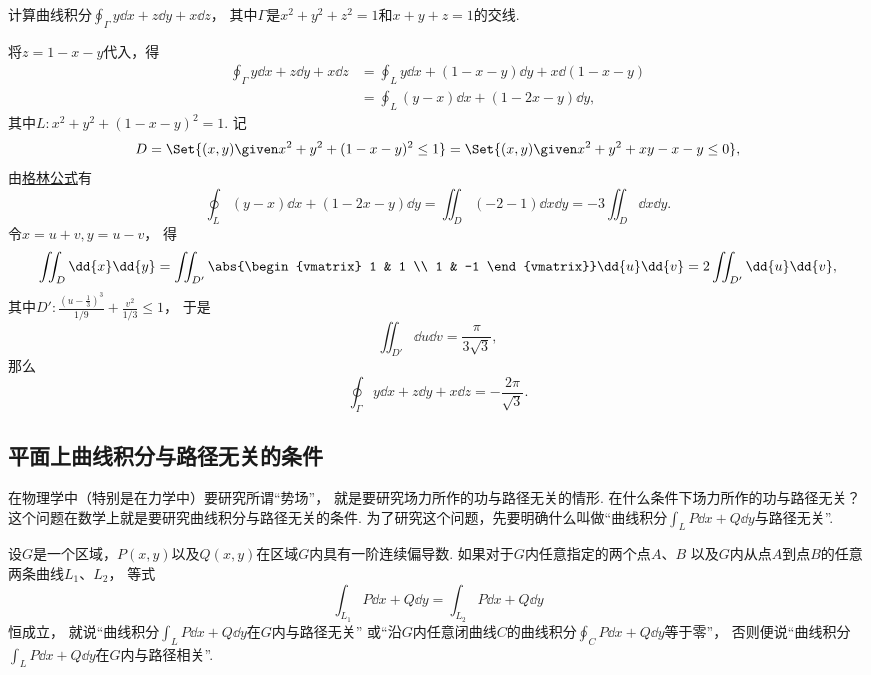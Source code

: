 \begin{example}
计算曲线积分\(\oint_\Gamma y \dd{x} + z \dd{y} + x \dd{z}\)，
其中\(\Gamma\)是\(x^2+y^2+z^2=1\)和\(x+y+z=1\)的交线.
\begin{solution}
将\(z = 1-x-y\)代入，得\begin{align*}
	\oint_\Gamma y \dd{x} + z \dd{y} + x \dd{z}
	&= \oint_L y \dd{x} + (1-x-y) \dd{y} + x \dd(1-x-y) \\
	&= \oint_L (y-x) \dd{x} + (1-2x-y) \dd{y},
\end{align*}
其中\(L: x^2+y^2+(1-x-y)^2=1\).
记\begin{equation*}
	D = \Set{ (x,y) \given x^2+y^2+(1-x-y)^2\leq1 }
	= \Set{ (x,y) \given x^2+y^2+xy-x-y\leq0 },
\end{equation*}
由\hyperref[equation:线积分与面积分.格林公式]{格林公式}有\begin{equation*}
	\oint_L (y-x) \dd{x} + (1-2x-y) \dd{y}
	= \iint_D (-2-1) \dd{x}\dd{y}
	= -3 \iint_D \dd{x}\dd{y}.
\end{equation*}
令\(x = u+v,
y = u-v\)，
得\begin{equation*}
	\iint_D \dd{x}\dd{y}
	= \iint_{D'} \abs{\begin{vmatrix}
		1 & 1 \\
		1 & -1
	\end{vmatrix}} \dd{u}\dd{v}
	= 2 \iint_{D'} \dd{u}\dd{v},
\end{equation*}
其中\(D': \frac{(u-\frac13)^3}{1/9}+\frac{v^2}{1/3}\leq1\)，
于是\begin{equation*}
	\iint_{D'} \dd{u}\dd{v}
	= \frac\pi{3\sqrt3},
\end{equation*}
那么\begin{equation*}
	\oint_\Gamma y \dd{x} + z \dd{y} + x \dd{z}
	= -\frac{2\pi}{\sqrt3}.
\end{equation*}
\end{solution}
\end{example}

\subsection{平面上曲线积分与路径无关的条件}
在物理学中（特别是在力学中）要研究所谓“势场”，
就是要研究场力所作的功与路径无关的情形.
在什么条件下场力所作的功与路径无关？
这个问题在数学上就是要研究曲线积分与路径无关的条件.
为了研究这个问题，先要明确什么叫做“曲线积分\(\int_L P\dd{x}+Q\dd{y}\)与路径无关”.
\begin{definition}
设\(G\)是一个区域，\(P(x,y)\)以及\(Q(x,y)\)在区域\(G\)内具有一阶连续偏导数.
如果对于\(G\)内任意指定的两个点\(A\)、\(B\)
以及\(G\)内从点\(A\)到点\(B\)的任意两条曲线\(L_1\)、\(L_2\)，
等式\begin{equation*}
	\int_{L_1} P\dd{x}+Q\dd{y}
	=\int_{L_2} P\dd{x}+Q\dd{y}
\end{equation*}恒成立，
就说“曲线积分\(\int_L P\dd{x}+Q\dd{y}\)在\(G\)内与路径无关”
或“沿\(G\)内任意闭曲线\(C\)的曲线积分\(\oint_C P\dd{x}+Q\dd{y}\)等于零”，
否则便说“曲线积分\(\int_L P\dd{x}+Q\dd{y}\)在\(G\)内与路径相关”.
\end{definition}

